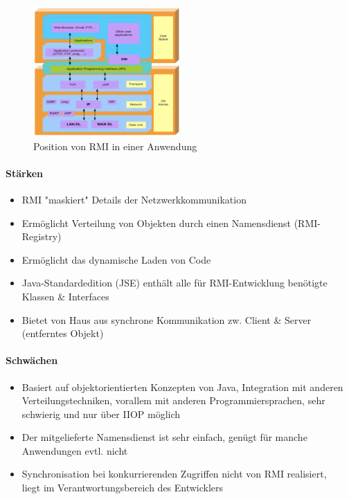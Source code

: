 \documentclass[a4paper]{article}
\begin{document}
		\begin{figure}[!htb]
			\centering
			\includegraphics[keepaspectratio, height=5cm]{img/rmi/overview.png}
			\caption{Position von RMI in einer Anwendung}
			\label{fig:rmi_overview}
		\end{figure}
		
			\paragraph{Stärken}
			
				\begin{itemize}
					\item RMI "maskiert" Details der Netzwerkkommunikation
					\item Ermöglicht Verteilung von Objekten durch einen Namensdienst (RMI-Registry)
					\item Ermöglicht das dynamische Laden von Code
					\item Java-Standardedition (JSE) enthält alle für RMI-Entwicklung benötigte Klassen \& Interfaces
					\item Bietet von Haus aus synchrone Kommunikation zw. Client \& Server (entferntes Objekt)
				\end{itemize}
			
			\paragraph{Schwächen}
			
				\begin{itemize}
					\item Basiert auf objektorientierten Konzepten von Java, Integration mit anderen Verteilungstechniken, vorallem mit anderen Programmiersprachen, sehr schwierig und nur über IIOP möglich
					\item Der mitgelieferte Namensdienst ist sehr einfach, genügt für manche Anwendungen evtl. nicht
					\item Synchronisation bei konkurrierenden Zugriffen nicht von RMI realisiert,\\ 
					liegt im Verantwortungsbereich des Entwicklers
				\end{itemize}
		
\end{document}
